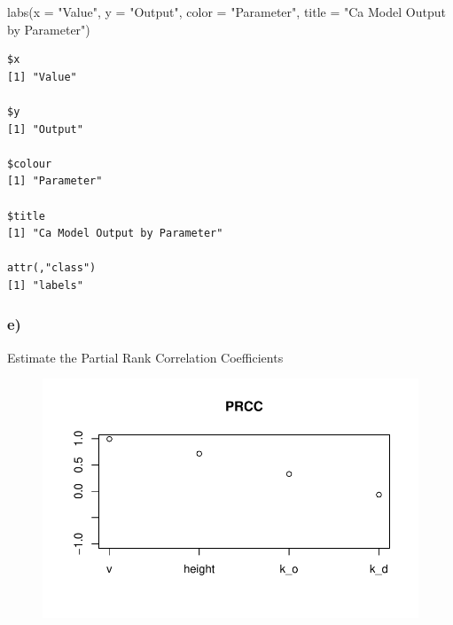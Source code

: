 \documentclass[
  letterpaper,
  DIV=11,
  numbers=noendperiod]{scrartcl}
\newenvironment{Shaded}{\begin{snugshade}}{\end{snugshade}}
\newcommand{\AttributeTok}[1]{\textcolor[rgb]{0.40,0.45,0.13}{#1}}
\newcommand{\ConstantTok}[1]{\textcolor[rgb]{0.56,0.35,0.01}{#1}}
\newcommand{\FunctionTok}[1]{\textcolor[rgb]{0.28,0.35,0.67}{#1}}
\newcommand{\NormalTok}[1]{\textcolor[rgb]{0.00,0.23,0.31}{#1}}
\newcommand{\OtherTok}[1]{\textcolor[rgb]{0.00,0.23,0.31}{#1}}
\newcommand{\SpecialCharTok}[1]{\textcolor[rgb]{0.37,0.37,0.37}{#1}}
\newcommand{\StringTok}[1]{\textcolor[rgb]{0.13,0.47,0.30}{#1}}
\begin{document}
\begin{Shaded}
\begin{Highlighting}[]
  \FunctionTok{labs}\NormalTok{(}\AttributeTok{x =} \StringTok{"Value"}\NormalTok{, }\AttributeTok{y =} \StringTok{"Output"}\NormalTok{, }\AttributeTok{color =} \StringTok{"Parameter"}\NormalTok{, }\AttributeTok{title =} \StringTok{"Ca Model Output by Parameter"}\NormalTok{)}
\end{Highlighting}
\end{Shaded}

\begin{verbatim}
$x
[1] "Value"

$y
[1] "Output"

$colour
[1] "Parameter"

$title
[1] "Ca Model Output by Parameter"

attr(,"class")
[1] "labels"
\end{verbatim}

\hypertarget{e}{%
\subsubsection{e)}\label{e}}

Estimate the Partial Rank Correlation Coefficients

\begin{Shaded}
\end{Shaded}

\begin{figure}[H]

{\centering \includegraphics{sensitivity-analysis_files/figure-pdf/unnamed-chunk-8-1.pdf}

}

\end{figure}
\end{document}
